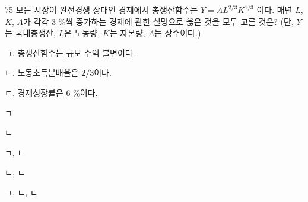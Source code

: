 \begin{question}{75}
모든 시장이 완전경쟁 상태인 경제에서 총생산함수는 $Y=AL^{2/3}K^{1/3}$ 이다. 매년 $L$, $K$, $A$가 각각 3 \%씩 증가하는 경제에 관한 설명으로 옳은 것을 모두 고른 것은? (단, $Y$는 국내총생산, $L$은 노동량, $K$는 자본량, $A$는 상수이다.)
\begin{framedtext}
ㄱ. 총생산함수는 규모 수익 불변이다. \par
ㄴ. 노동소득분배율은 $2/3$이다. \par
ㄷ. 경제성장률은 6 \%이다. \par
\end{framedtext}
\begin{choices}
  \item ㄱ
  \item ㄴ
  \item ㄱ, ㄴ
  \item ㄴ, ㄷ
  \item ㄱ, ㄴ, ㄷ
\end{choices}
\end{question}

